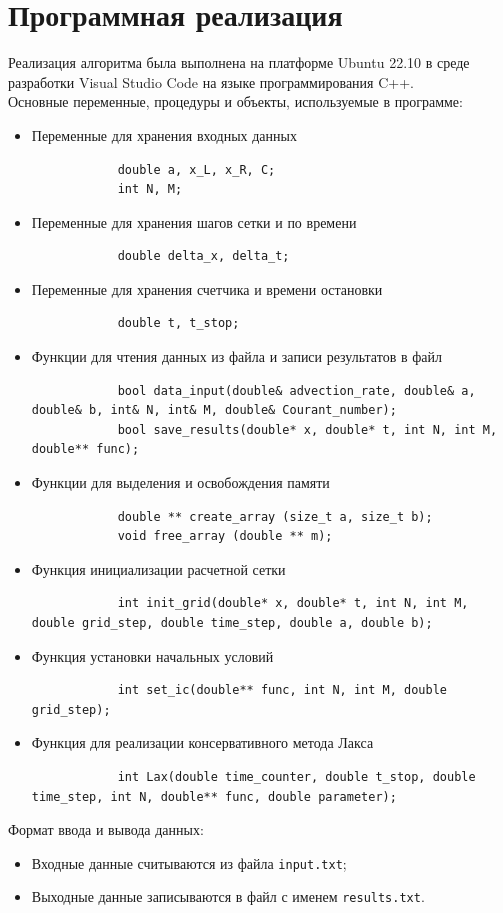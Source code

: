 \documentclass[12pt,a4paper]{article}
\begin{document}
	\section{Программная реализация}
	Реализация алгоритма была выполнена на платформе Ubuntu 22.10 в среде разработки Visual Studio Code на языке программирования C++.\\
	Основные переменные, процедуры и объекты, используемые в программе:
	\begin{itemize}
		\item Переменные для хранения входных данных
		\begin{lstlisting}
			double a, x_L, x_R, C;
			int N, M;
		\end{lstlisting}
		\item Переменные для хранения шагов сетки и по времени
		\begin{lstlisting}
			double delta_x, delta_t;
		\end{lstlisting}
		\item Переменные для хранения счетчика и времени остановки
		\begin{lstlisting}
			double t, t_stop;
		\end{lstlisting}
		\item Функции для чтения данных из файла и записи результатов в файл
		\begin{lstlisting}
			bool data_input(double& advection_rate, double& a, double& b, int& N, int& M, double& Courant_number);
			bool save_results(double* x, double* t, int N, int M, double** func);
		\end{lstlisting}
		\item Функции для выделения и освобождения памяти
		\begin{lstlisting}
			double ** create_array (size_t a, size_t b);
			void free_array (double ** m);
		\end{lstlisting}
		\item Функция инициализации расчетной сетки
		\begin{lstlisting}
			int init_grid(double* x, double* t, int N, int M, double grid_step, double time_step, double a, double b);
		\end{lstlisting}
		\item Функция установки начальных условий
		\begin{lstlisting}
			int set_ic(double** func, int N, int M, double grid_step);
		\end{lstlisting}
		\item Функция для реализации консервативного метода Лакса
		\begin{lstlisting}
			int Lax(double time_counter, double t_stop, double time_step, int N, double** func, double parameter);
		\end{lstlisting}
	\end{itemize}
	Формат ввода и вывода данных:
	\begin{itemize}
		\item Входные данные считываются из файла \texttt{input.txt};
		\item Выходные данные записываются в файл с именем \texttt{results.txt}.
	\end{itemize}
	
\end{document}
